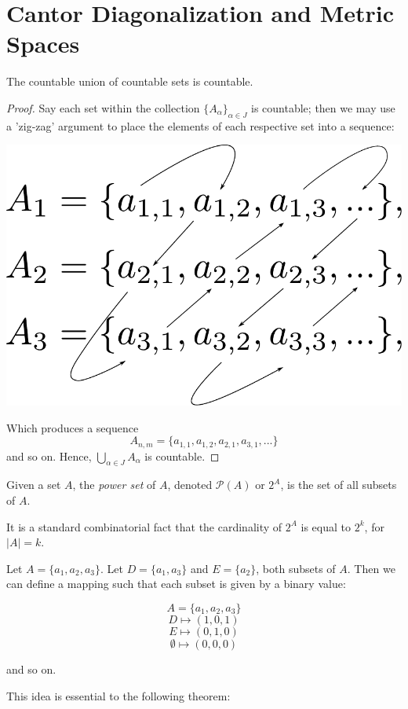 \section{Cantor Diagonalization and Metric Spaces}

\begin{theorem}
	The countable union of countable sets is countable.
\end{theorem}

\begin{proof}
	Say each set within the collection $\{A_\alpha\}_{\alpha\in J}$ is countable; then we may use a 'zig-zag' argument to place the elements of each respective set into a sequence:

\begin{center}
    
\includegraphics[width=.43\linewidth]{figures/diagonlization.pdf}

\end{center}
    
Which produces a sequence $$A_{n,m}=\{a_{1,1},a_{1,2},a_{2,1},a_{3,1},...\}$$
and so on. Hence, $\bigcup_{\alpha\in J}A_\alpha$ is countable.
\end{proof}

\begin{definition}
	Given a set $A$, the \emph{power set} of $A$, denoted $\mathcal{P}(A)$ or $2^A$, is the set of all subsets of $A$.
\end{definition}
It is a standard combinatorial fact that the cardinality of $2^A$ is equal to $2^{k}$, for $|A|=k$.

\begin{eg}
	Let $A=\{a_1,a_2,a_3\}$. Let $D=\{a_1,a_3\}$ and $E=\{a_2\}$, both subsets of $A$. Then we can define a mapping such that each subset is given by a binary value:

$$A=\{a_1,a_2,a_3\}$$
$$D\mapsto(1,0,1)$$
$$E\mapsto(0,1,0)$$
$$\emptyset\mapsto(0,0,0)$$

and so on.
    
\end{eg}

This idea is essential to the following theorem:

